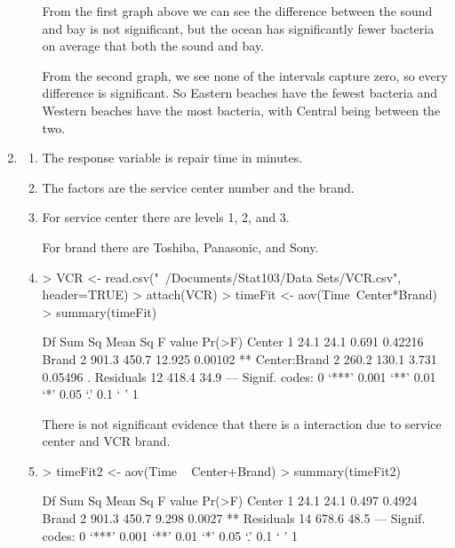 \documentclass{article}
\begin{document}
\begin{enumerate}
\begin{enumerate}
From the first graph above we can see the difference between the sound and bay is not significant, but the ocean has significantly fewer bacteria on average that both the sound and bay.

From the second graph, we see none of the intervals capture zero, so every difference is significant. So Eastern beaches have the fewest bacteria and Western beaches have the most bacteria, with Central being between the two. 

\end{enumerate}

\item

\begin{enumerate}

\item

The response variable is repair time in minutes.

\item

The factors are the service center number and the brand.

\item

For service center there are levels 1, 2, and 3.

For brand there are Toshiba, Panasonic, and Sony.

\item

\begin{Schunk}
\begin{Sinput}
> VCR <- read.csv("~/Documents/Stat103/Data Sets/VCR.csv", header=TRUE)
> attach(VCR)
> timeFit <- aov(Time~Center*Brand)
> summary(timeFit)
\end{Sinput}
\begin{Soutput}
             Df Sum Sq Mean Sq F value  Pr(>F)   
Center        1   24.1    24.1   0.691 0.42216   
Brand         2  901.3   450.7  12.925 0.00102 **
Center:Brand  2  260.2   130.1   3.731 0.05496 . 
Residuals    12  418.4    34.9                   
---
Signif. codes:  0 ‘***’ 0.001 ‘**’ 0.01 ‘*’ 0.05 ‘.’ 0.1 ‘ ’ 1
\end{Soutput}
\end{Schunk}

There is not significant evidence that there is a interaction due to service center and VCR brand.

\item

\begin{Schunk}
\begin{Sinput}
> timeFit2 <- aov(Time ~ Center+Brand)
> summary(timeFit2)
\end{Sinput}
\begin{Soutput}
            Df Sum Sq Mean Sq F value Pr(>F)   
Center       1   24.1    24.1   0.497 0.4924   
Brand        2  901.3   450.7   9.298 0.0027 **
Residuals   14  678.6    48.5                  
---
Signif. codes:  0 ‘***’ 0.001 ‘**’ 0.01 ‘*’ 0.05 ‘.’ 0.1 ‘ ’ 1
\end{Soutput}
\end{Schunk}


\end{enumerate}
\end{enumerate}
\end{document}
